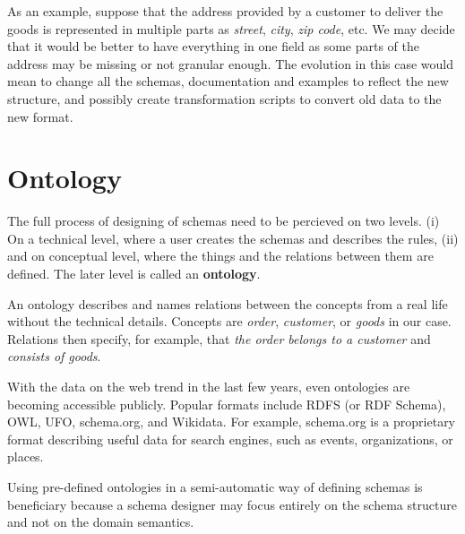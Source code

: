 \begin{showcase}
    As an example, suppose that the address provided by a customer to deliver the goods is represented in multiple parts as \textit{street}, \textit{city}, \textit{zip code}, etc. We may decide that it would be better to have everything in one field as some parts of the address may be missing or not granular enough. The evolution in this case would mean to change all the schemas, documentation and examples to reflect the new structure, and possibly create transformation scripts to convert old data to the new format.
\end{showcase}

\section*{Ontology}

The full process of designing of schemas need to be percieved on two levels. (i) On a technical level, where a user creates the schemas and describes the rules, (ii) and on conceptual level, where the things and the relations between them are defined. The later level is called an \textbf{ontology}.

An ontology describes and names relations between the concepts from a real life without the technical details. Concepts are \textit{order}, \textit{customer}, or \textit{goods} in our case. Relations then specify, for example, that \textit{the order belongs to a customer} and \textit{consists of goods}.

With the data on the web \cite{data-on-the-web} trend in the last few years, even ontologies are becoming accessible publicly. Popular formats include RDFS (or RDF Schema), OWL, UFO, schema.org, and Wikidata. For example, schema.org is a proprietary format describing useful data for search engines, such as events, organizations, or places.

Using pre-defined ontologies in a semi-automatic way of defining schemas is beneficiary because a schema designer may focus entirely on the schema structure and not on the domain semantics.

